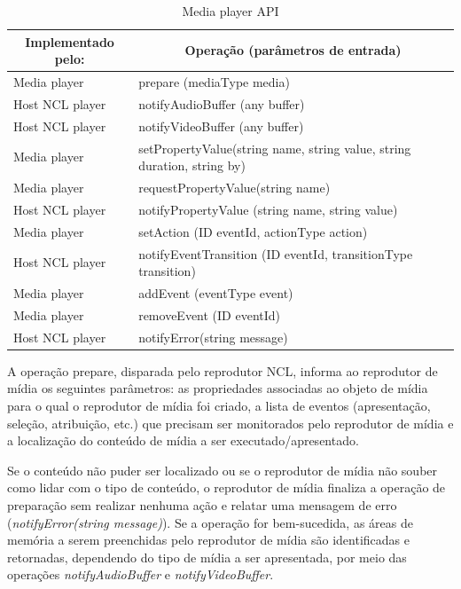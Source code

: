 \begin{table}[h]
\label{tab:mediaAPI}
\caption{Media player API}
\centering
{
  \renewcommand\arraystretch{1.25}
  \begin{tabular}{|p{5cm}|p{10cm}|} \hline
   \multicolumn{1}{|c|}{Implementado pelo:} & \multicolumn{1}{c|}{Operação (parâmetros de entrada)}  \\\hline 
   Media player & prepare (mediaType media) \\\hline
   Host NCL player & notifyAudioBuffer (any buffer) \\\hline
   Host NCL player & notifyVideoBuffer (any buffer)\\\hline
   Media player & setPropertyValue(string name, string value, string duration, string by) \\\hline
   Media player & requestPropertyValue(string name) \\\hline
   Host NCL player & notifyPropertyValue (string name, string value)\\\hline
   Media player & setAction (ID eventId, actionType action) \\\hline
   Host NCL player & notifyEventTransition (ID eventId, transitionType transition) \\\hline
   Media player & addEvent (eventType event) \\\hline
   Media player & removeEvent (ID eventId) \\\hline
   Host NCL player & notifyError(string message) \\\hline
  \end{tabular}
}
\end{table}

A operação prepare, disparada pelo reprodutor NCL, informa ao reprodutor de mídia os seguintes parâmetros: as propriedades associadas ao objeto de mídia para o qual o reprodutor de mídia foi criado, a lista de eventos (apresentação, seleção, atribuição, etc.) que precisam ser monitorados pelo reprodutor de mídia e a localização do conteúdo de mídia a ser executado/apresentado.

Se o conteúdo não puder ser localizado ou se o reprodutor de mídia não souber como lidar com o tipo de conteúdo, o reprodutor de mídia finaliza a operação de preparação sem realizar nenhuma ação e relatar uma mensagem de erro (\textit{notifyError(string message)}). Se a operação for bem-sucedida, as áreas de memória a serem preenchidas pelo reprodutor de mídia são identificadas e retornadas, dependendo do tipo de mídia a ser apresentada, por meio das operações \textit{notifyAudioBuffer} e \textit{notifyVideoBuffer}.

